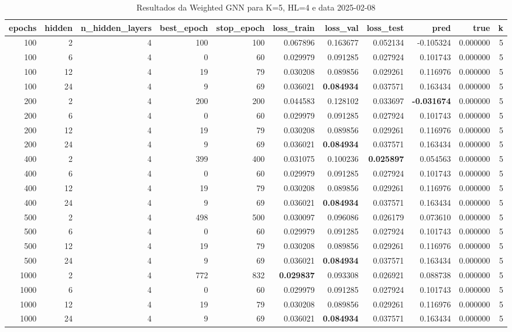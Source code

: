 \begin{table}
\caption{Resultados da Weighted GNN para K=5, HL=4 e data 2025-02-08}
\label{tab:weighted_gnn_results_k5_hl4_d20250208}
\begin{tabular}{rrrrrrrrrrr}
\toprule
epochs & hidden & n\_hidden\_layers & best\_epoch & stop\_epoch & loss\_train & loss\_val & loss\_test & pred & true & k \\
\midrule
100 & 2 & 4 & 100 & 100 & 0.067896 & 0.163677 & 0.052134 & -0.105324 & 0.000000 & 5 \\
100 & 6 & 4 & 0 & 60 & 0.029979 & 0.091285 & 0.027924 & 0.101743 & 0.000000 & 5 \\
100 & 12 & 4 & 19 & 79 & 0.030208 & 0.089856 & 0.029261 & 0.116976 & 0.000000 & 5 \\
100 & 24 & 4 & 9 & 69 & 0.036021 & \textbf{0.084934} & 0.037571 & 0.163434 & 0.000000 & 5 \\
200 & 2 & 4 & 200 & 200 & 0.044583 & 0.128102 & 0.033697 & \textbf{-0.031674} & 0.000000 & 5 \\
200 & 6 & 4 & 0 & 60 & 0.029979 & 0.091285 & 0.027924 & 0.101743 & 0.000000 & 5 \\
200 & 12 & 4 & 19 & 79 & 0.030208 & 0.089856 & 0.029261 & 0.116976 & 0.000000 & 5 \\
200 & 24 & 4 & 9 & 69 & 0.036021 & \textbf{0.084934} & 0.037571 & 0.163434 & 0.000000 & 5 \\
400 & 2 & 4 & 399 & 400 & 0.031075 & 0.100236 & \textbf{0.025897} & 0.054563 & 0.000000 & 5 \\
400 & 6 & 4 & 0 & 60 & 0.029979 & 0.091285 & 0.027924 & 0.101743 & 0.000000 & 5 \\
400 & 12 & 4 & 19 & 79 & 0.030208 & 0.089856 & 0.029261 & 0.116976 & 0.000000 & 5 \\
400 & 24 & 4 & 9 & 69 & 0.036021 & \textbf{0.084934} & 0.037571 & 0.163434 & 0.000000 & 5 \\
500 & 2 & 4 & 498 & 500 & 0.030097 & 0.096086 & 0.026179 & 0.073610 & 0.000000 & 5 \\
500 & 6 & 4 & 0 & 60 & 0.029979 & 0.091285 & 0.027924 & 0.101743 & 0.000000 & 5 \\
500 & 12 & 4 & 19 & 79 & 0.030208 & 0.089856 & 0.029261 & 0.116976 & 0.000000 & 5 \\
500 & 24 & 4 & 9 & 69 & 0.036021 & \textbf{0.084934} & 0.037571 & 0.163434 & 0.000000 & 5 \\
1000 & 2 & 4 & 772 & 832 & \textbf{0.029837} & 0.093308 & 0.026921 & 0.088738 & 0.000000 & 5 \\
1000 & 6 & 4 & 0 & 60 & 0.029979 & 0.091285 & 0.027924 & 0.101743 & 0.000000 & 5 \\
1000 & 12 & 4 & 19 & 79 & 0.030208 & 0.089856 & 0.029261 & 0.116976 & 0.000000 & 5 \\
1000 & 24 & 4 & 9 & 69 & 0.036021 & \textbf{0.084934} & 0.037571 & 0.163434 & 0.000000 & 5 \\
\bottomrule
\end{tabular}
\end{table}

